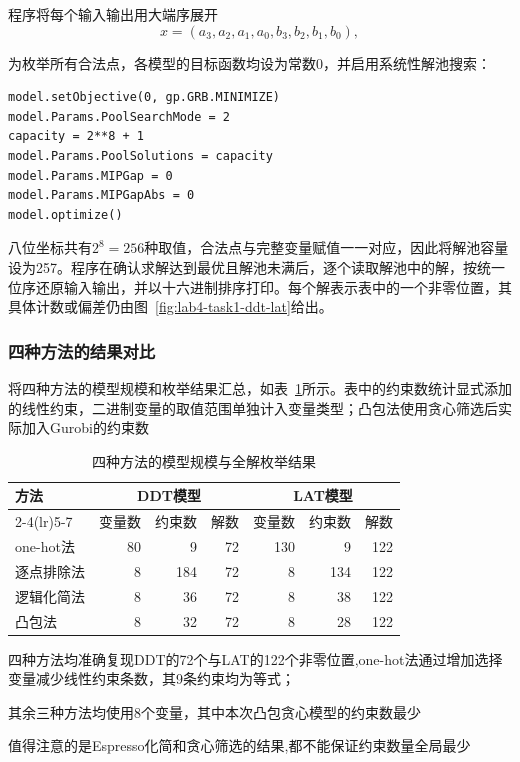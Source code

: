 程序将每个输入输出用大端序展开
\[
x=(a_3,a_2,a_1,a_0,b_3,b_2,b_1,b_0),
\]

为枚举所有合法点，各模型的目标函数均设为常数0，并启用系统性解池搜索：
\begin{lstlisting}
model.setObjective(0, gp.GRB.MINIMIZE)
model.Params.PoolSearchMode = 2
capacity = 2**8 + 1
model.Params.PoolSolutions = capacity
model.Params.MIPGap = 0
model.Params.MIPGapAbs = 0
model.optimize()
\end{lstlisting}

八位坐标共有$2^8=256$种取值，合法点与完整变量赋值一一对应，因此将解池容量设为257。程序在确认求解达到最优且解池未满后，逐个读取解池中的解，按统一位序还原输入输出，并以十六进制排序打印。每个解表示表中的一个非零位置，其具体计数或偏差仍由图~\ref{fig:lab4-task1-ddt-lat}给出。






\clearpage
\subsubsection{四种方法的结果对比}

将四种方法的模型规模和枚举结果汇总，如表~\ref{tab:lab4-task1-comparison}所示。表中的约束数统计显式添加的线性约束，二进制变量的取值范围单独计入变量类型；凸包法使用贪心筛选后实际加入Gurobi的约束数

\begin{table}[H]
    \centering
    \caption{四种方法的模型规模与全解枚举结果}
    \label{tab:lab4-task1-comparison}
    \begin{tabular}{lrrrrrr}
        \toprule
        \multirow{2}{*}{方法} & \multicolumn{3}{c}{DDT模型} & \multicolumn{3}{c}{LAT模型} \\
        \cmidrule(lr){2-4}\cmidrule(lr){5-7}
        & 变量数 & 约束数 & 解数 & 变量数 & 约束数 & 解数 \\
        \midrule
        one-hot法 & 80 & 9 & 72 & 130 & 9 & 122 \\
        逐点排除法 & 8 & 184 & 72 & 8 & 134 & 122 \\
        逻辑化简法 & 8 & 36 & 72 & 8 & 38 & 122 \\
        凸包法 & 8 & 32 & 72 & 8 & 28 & 122 \\
        \bottomrule
    \end{tabular}
\end{table}

四种方法均准确复现DDT的72个与LAT的122个非零位置,one-hot法通过增加选择变量减少线性约束条数，其9条约束均为等式；

其余三种方法均使用8个变量，其中本次凸包贪心模型的约束数最少

值得注意的是Espresso化简和贪心筛选的结果,都不能保证约束数量全局最少
